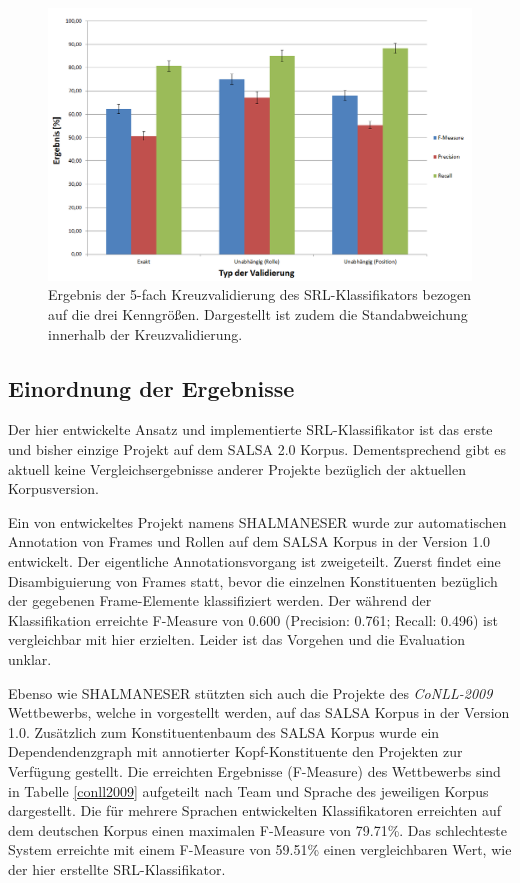 \documentclass[12pt]{article}
\begin{document}
	\begin{figure}[tb!]
		\centering
		\includegraphics[scale=0.5]{images/ergebnisseKreuzvalidierung.png}
		\caption[Ergebnis der 5-fach Kreuzvalidierung]{Ergebnis der 5-fach Kreuzvalidierung des SRL-Klassifikators bezogen auf die drei Kenngrößen. Dargestellt ist zudem die Standabweichung innerhalb der Kreuzvalidierung.}
		\label{evalKreuzvalidierung}
	\end{figure}
	
\subsection{Einordnung der Ergebnisse}
		
Der hier entwickelte Ansatz und implementierte SRL-Klassifikator ist das erste und bisher einzige Projekt auf dem SALSA 2.0 Korpus. Dementsprechend gibt es aktuell keine Vergleichsergebnisse anderer Projekte bezüglich der aktuellen Korpusversion.

Ein von \cite{erk2006shalmaneser} entwickeltes Projekt namens SHALMANESER wurde zur automatischen Annotation von Frames und Rollen auf dem SALSA Korpus in der Version 1.0 entwickelt. Der eigentliche Annotationsvorgang ist zweigeteilt. Zuerst findet eine Disambiguierung von Frames statt, bevor die einzelnen Konstituenten bezüglich der gegebenen Frame-Elemente klassifiziert werden. Der während der Klassifikation erreichte F-Measure von 0.600 (Precision: 0.761; Recall: 0.496) ist vergleichbar mit hier erzielten. Leider ist das Vorgehen und die Evaluation unklar.

Ebenso wie SHALMANESER stützten sich auch die Projekte des \textit{CoNLL-2009} Wettbewerbs, welche in \cite{hajivc2009conll} vorgestellt werden, auf das SALSA Korpus in der Version 1.0. Zusätzlich zum Konstituentenbaum des SALSA Korpus wurde ein Dependendenzgraph mit annotierter Kopf-Konstituente den Projekten zur Verfügung gestellt. Die erreichten Ergebnisse (F-Measure) des Wettbewerbs sind in Tabelle \ref{conll2009} aufgeteilt nach Team und Sprache des jeweiligen Korpus dargestellt. Die für mehrere Sprachen entwickelten Klassifikatoren erreichten auf dem deutschen Korpus einen maximalen F-Measure von 79.71\%. Das schlechteste System erreichte mit einem F-Measure von 59.51\% einen vergleichbaren Wert, wie der hier erstellte SRL-Klassifikator.
\end{document}
